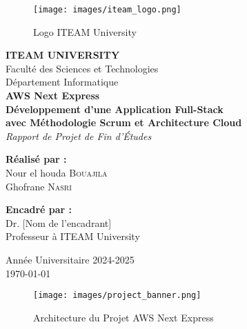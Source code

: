 \begin{titlepage}
    \centering
    
    \begin{figure}[H]
        \centering
        \texttt{[image: images/iteam\_logo.png]}
        \caption*{Logo ITEAM University}
    \end{figure}
    
    \vspace{1cm}
    
    {\LARGE \textbf{ITEAM UNIVERSITY}}\\[0.5cm]
    {\large Faculté des Sciences et Technologies}\\[0.5cm]
    {\large Département Informatique}\\[2cm]
    
    {\Huge \textbf{\color{primaryblue}AWS Next Express}}\\[1cm]
    {\Large \textbf{Développement d'une Application Full-Stack}}\\[0.5cm]
    {\Large \textbf{avec Méthodologie Scrum et Architecture Cloud}}\\[2cm]
    
    {\large \textit{Rapport de Projet de Fin d'Études}}\\[1.5cm]
    
    \begin{minipage}[t]{0.4\textwidth}
        \begin{flushleft}
            \textbf{Réalisé par :}\\[0.5cm]
            Nour el houda \textsc{Bouajila}\\
            Ghofrane \textsc{Nasri}
        \end{flushleft}
    \end{minipage}
    \hfill
    \begin{minipage}[t]{0.4\textwidth}
        \begin{flushright}
            \textbf{Encadré par :}\\[0.5cm]
            Dr. [Nom de l'encadrant]\\
            Professeur à ITEAM University
        \end{flushright}
    \end{minipage}
    
    \vfill
    
    {\large Année Universitaire 2024-2025}\\[0.5cm]
    {\large \today}
    
    \vspace{1cm}
    \begin{figure}[H]
        \centering
        \texttt{[image: images/project\_banner.png]}
        \caption*{Architecture du Projet AWS Next Express}
    \end{figure}
    
\end{titlepage}

